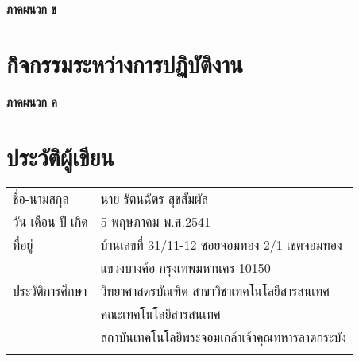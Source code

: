 \clearpage 
\thispagestyle{empty}
\begin{center}
	\LARGE{\textbf{ภาคผนวก ข}}
\end{center}

\chapter{กิจกรรมระหว่างการปฏิบัติงาน}

\clearpage 
\thispagestyle{empty}
\begin{center}
	\LARGE{\textbf{ภาคผนวก ค}}
\end{center}

\chapter{ประวัติผู้เขียน}
\begin{tabularx}{\linewidth}{lX}
	ชื่อ-นามสกุล&นาย รัตนฉัตร สุขสัมผัส\\
	วัน เดือน ปี เกิด&5 พฤษภาคม พ.ศ.2541\\
	ที่อยู่& บ้านเลขที่ 31/11-12 ซอยจอมทอง 2/1 เขตจอมทอง 
	\\
	&แขวงบางค้อ กรุงเทพมหานคร 10150
	\\
	ประวัติการศึกษา&วิทยาศาสตรบัณฑิต สาขาวิชาเทคโนโลยีสารสนเทศ
	\\
	&คณะเทคโนโลยีสารสนเทศ
	\\
	&สถาบันเทคโนโลยีพระจอมเกล้าเจ้าคุณทหารลาดกระบัง
	\\
	\\
\end{tabularx}